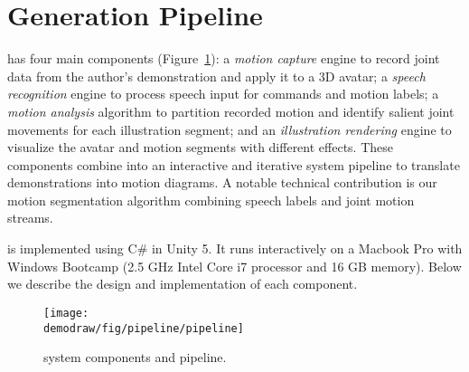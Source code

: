 
\section{Generation Pipeline}


\systemname{} has four main components (Figure~\ref{fig:pipeline}):
%
a \emph{motion capture} engine to record joint data from the author's demonstration and apply it to a 3D avatar;
%
a \emph{speech recognition} engine to process speech input for commands and motion labels;
%
a \emph{motion analysis} algorithm to partition recorded motion and identify salient joint movements for each illustration segment;
%
and an \emph{illustration rendering} engine to visualize the avatar and motion segments with different effects.
%
These components combine into an interactive and iterative system pipeline to translate demonstrations into motion diagrams.
A notable technical contribution is our motion segmentation algorithm combining speech labels and joint motion streams.

%
\systemname{} is implemented using C\# in Unity 5. %
It runs interactively on a Macbook Pro with Windows Bootcamp (2.5 GHz Intel Core i7 processor and 16 GB memory).
%
Below we describe the design and implementation of each component.

\begin{figure}[t]
  \centering
  \texttt{[image: \\demodraw/fig/pipeline/pipeline]}
  \caption{\systemname{} system components and pipeline.}
  \label{fig:pipeline}
\end{figure}


